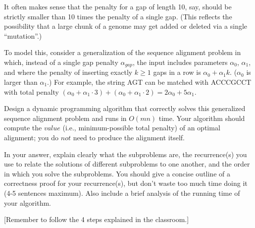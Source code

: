 \documentclass{article}
\begin{document}
It often makes sense that the penalty for a gap of length 10, say, should be strictly smaller than 10 times the penalty of a single gap. (This reflects the possibility that a large chunk of a genome may get added or deleted via a single ``mutation''.)

To model this, consider a generalization of the sequence alignment problem in which, instead of a single gap penalty $\alpha_{gap}$, the input includes parameters $\alpha_0$, $\alpha_1$, and where the penalty of inserting exactly $k \geq 1$ gaps in a row is $\alpha_0 + \alpha_1 k$. ($\alpha_0$ is larger than $\alpha_1$.) For example, the string AGT can be matched with ACCCGCCT with total penalty $(\alpha_0 + \alpha_1 \cdot 3) + (\alpha_0 + \alpha_1 \cdot 2) = 2\alpha_0 + 5\alpha_1$.

Design a dynamic programming algorithm that correctly solves this generalized sequence alignment problem and runs in $O(mn)$ time. Your algorithm should compute the $value$ (i.e., minimum-possible total penalty) of an optimal alignment; you do $not$ need to produce the alignment itself.

In your answer, explain clearly what the subproblems are, the recurrence(s) you use to relate the solutions of different subproblems to one another, and the order in which you solve the subproblems.
You should give a concise outline of a correctness proof for your
recurrence(s), but don't waste too much time doing it (4-5 sentences
maximum). Also include a brief analysis of the running time of your
algorithm.

[Remember to follow the 4 steps explained in the classroom.]
\end{document}
